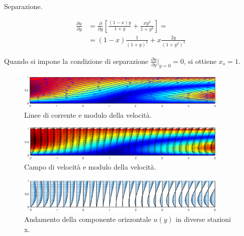 \partone
 Separazione.

\parttwo


\begin{equation}
\begin{aligned}
  \frac{\partial u}{\partial y} & = \frac{\partial}{\partial y} \displaystyle \left[
  \frac{(1-x)y}{1+y} + \frac{xy^2}{1+y^2} \right] = \\
  & = (1-x)\frac{1}{(1+y)^2} + x \frac{2y}{(1+y^2)^2}
\end{aligned}
\end{equation}

Quando si impone la condizione di separazione $\frac{\partial u}{\partial y}\big|_{y=0} = 0$, si ottiene $x_s = 1$.

\begin{figure}[h!]
  \centering
   \includegraphics[width=0.90\textwidth,trim = {10mm 30mm 10mm 20mm}, clip]{./fig/Ese75contour.eps}
   \caption{Linee di corrente e modulo della velocità.}
\end{figure}

\begin{figure}[h!]
\centering
   \includegraphics[width=0.90\textwidth,trim = {10mm 50mm 10mm 40mm}, clip]{./fig/Ese75quiver.eps}
   \caption{Campo di velocità e modulo della velocità.}
\end{figure}

\begin{figure}[h!]
\centering
   \includegraphics[width=0.90\textwidth,trim = {10mm 60mm 10mm 60mm}, clip]{./fig/Ese75u.eps}
   \caption{Andamento della componente orizzontale $u(y)$ in diverse stazioni x.}
\end{figure}

